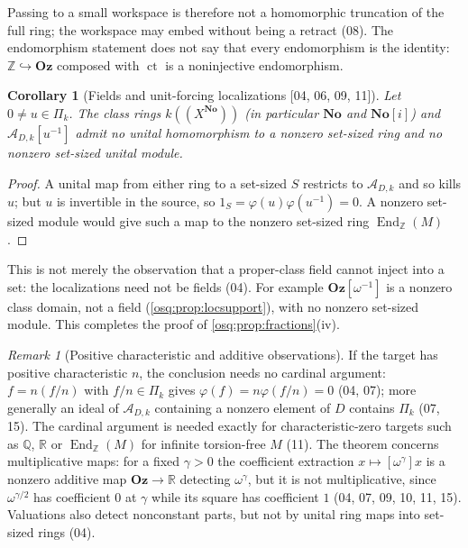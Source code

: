 \documentclass[11pt,letterpaper]{article}
\numberwithin{equation}{section}
\newtheorem{corollary}[corollary]{Corollary}
\theoremstyle{definition}
\theoremstyle{remark}
\newtheorem{remark}[remark]{Remark}
\theoremstyle{plain}
\newcommand{\No}{\mathbf{No}}
\newcommand{\Oz}{\mathbf{Oz}}
\newcommand{\SC}{\No[i]}
\newcommand{\Z}{\mathbb Z}
\newcommand{\Q}{\mathbb Q}
\newcommand{\R}{\mathbb R}
\newcommand{\A}{\mathcal A}          %
\newcommand{\hahn}[2]{#1(\!(X^{#2})\!)}
\newcommand{\ct}{\operatorname{ct}}
\newcommand{\End}{\operatorname{End}}
\newcommand{\src}[1]{\textup{\textsf{[#1]}}}
\begin{document}
Passing to a small workspace is therefore not a homomorphic truncation of the full ring;
the workspace may embed without being a retract (08). The endomorphism statement does not
say that every endomorphism is the identity: $\Z\hookrightarrow\Oz$ composed with $\ct$ is
a noninjective endomorphism.

\begin{corollary}[Fields and unit-forcing localizations \src{04, 06, 09, 11}]\label{osq:cor:nofield}
Let $0\ne u\in\Pi_k$. The class rings $\hahn k\No$ (in particular $\No$ and $\SC$) and
$\A_{D,k}[u^{-1}]$ admit no unital homomorphism to a nonzero set-sized ring and no nonzero
set-sized unital module.
\end{corollary}
\begin{proof}
A unital map from either ring to a set-sized $S$ restricts to $\A_{D,k}$ and so kills $u$;
but $u$ is invertible in the source, so $1_S=\varphi(u)\varphi(u^{-1})=0$. A nonzero
set-sized module would give such a map to the nonzero set-sized ring $\End_\Z(M)$.
\end{proof}

This is not merely the observation that a proper-class field cannot inject into a set: the
localizations need not be fields (04). For example $\Oz[\omega^{-1}]$ is a nonzero class
domain, not a field (\cref{osq:prop:locsupport}), with no nonzero set-sized module. This
completes the proof of \cref{osq:prop:fractions}(iv).

\begin{remark}[Positive characteristic and additive observations]\label{osq:rem:poschar}
If the target has positive characteristic $n$, the conclusion needs no cardinal argument:
$f=n(f/n)$ with $f/n\in\Pi_k$ gives $\varphi(f)=n\varphi(f/n)=0$ (04, 07); more generally
an ideal of $\A_{D,k}$ containing a nonzero element of $D$ contains $\Pi_k$ (07, 15). The
cardinal argument is needed exactly for characteristic-zero targets such as $\Q$, $\R$ or
$\End_\Z(M)$ for infinite torsion-free $M$ (11). The theorem concerns multiplicative
maps: for a fixed $\gamma>0$ the coefficient extraction $x\mapsto[\omega^\gamma]x$ is a
nonzero additive map $\Oz\to\R$ detecting $\omega^\gamma$, but it is not multiplicative,
since $\omega^{\gamma/2}$ has coefficient $0$ at $\gamma$ while its square has coefficient
$1$ (04, 07, 09, 10, 11, 15). Valuations also detect nonconstant parts, but not by unital ring
maps into set-sized rings (04).
\end{remark}
\end{document}
